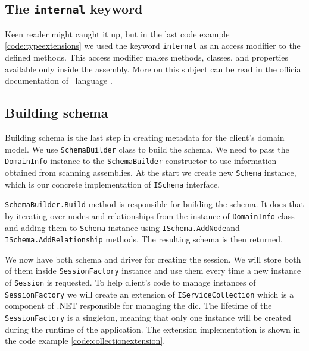 \subsection{The \texttt{internal} keyword}

Keen reader might caught it up, but in the last code example \ref{code:typeextensions} we used the keyword \texttt{internal}
as an access modifier to the defined methods. This access modifier makes methods, classes, and properties available only inside the assembly. More on this subject
can be read in the official documentation of \CS\ language \cite{wagner_internal_2022}.

\subsection {Building schema}

Building schema is the last step in creating metadata for the client's domain model.
We use \texttt{SchemaBuilder} class to build the schema.
We need to pass the \texttt{DomainInfo} instance to the \texttt{SchemaBuilder} constructor to use information obtained from scanning assemblies.
At the start we create new \texttt{Schema} instance, which is our concrete implementation of \texttt{ISchema} interface.

\texttt{SchemaBuilder.Build} method is responsible for building the schema.
It does that by iterating over nodes and relationships from the instance of \texttt{DomainInfo} class and adding them to \texttt{Schema} instance using \texttt{ISchema.AddNode}\linebreak and \texttt{ISchema.AddRelationship} methods.
The resulting schema is then returned.

We now have both schema and driver for creating the session.
We will store both of them inside \texttt{SessionFactory} instance and use them every time a new instance of \texttt{Session} is requested.
To help client's code to manage instances of \texttt{SessionFactory} we will create an extension of \texttt{IServiceCollection} which is a component of .NET responsible for managing the \acrfull{dic}.
The lifetime of the \texttt{SessionFactory} is a singleton, meaning that only one instance will be created during the runtime of the application.
The extension implementation is shown in the code example \ref{code:collectionextension}.


